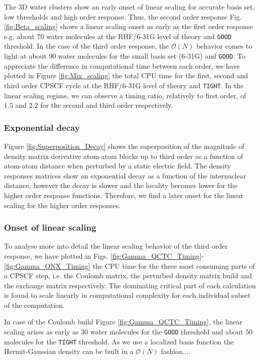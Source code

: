 \documentclass[prl,aps,twocolumn,showpacs,twocolumngrid,superbib]{revtex4}
\begin{document}
The 3D water clusters show an early onset of linear scaling for accurate
basis set, low thresholds and high order response.
Thus, the second order response Fig. \ref{fig:Beta_scaling} shows a linear scaling
onset as early as the first order response e.g. about 70 water molecules at
the RHF/6-31G level of theory and {\tt GOOD} threshold. In the case of the third order
response, the $\mathcal{O}(N)$ behavior comes to light at about 90 water 
molecules for the small basis set (6-31G) and {\tt GOOD}. 
To appreciate the difference in computational time between each order,
we have plotted in Figure \ref{fig:Mix_scaling} the total CPU time for the
first, second and third order CPSCF cycle at the RHF/6-31G level of theory and {\tt TIGHT}. 
In the linear scaling regime, we can observe a timing ratio, relatively to first order, 
of $1.5$ and $2.2$ for the second and third order respectively.

\subsubsection{Exponential decay}
Figure \ref{fig:Superposition_Decay} shows the superposition 
of the magnitude of density matrix derivative atom-atom blocks up to 
third order as a function of atom-atom distance when perturbed by 
a static electric field. 
The density responses matrices show an exponential decay as a function
of the internuclear distance, however the decay is slower and the locality
becomes lower for the higher order response functions.
Therefore, we find a later onset for the linear scaling for the higher order
responses. 


\subsubsection{Onset of linear scaling}

To analyse more into detail the linear scaling behavior of the third order
response, we have plotted in Figs. \ref{fig:Gamma_QCTC_Timing}-\ref{fig:Gamma_ONX_Timing} 
the CPU time for the three most consuming parts of a CPSCF step, i.e. the Coulomb matrix, 
the perturbed density matrix build and the exchange matrix respectively. 
The dominating critical part of each calculation is found to scale linearly
in computational complexity for each individual subset of the computation. 

In case of the Coulomb build Figure \ref{fig:Gamma_QCTC_Timing}, 
the linear scaling arises as early as 30 water molecules for the 
{\tt GOOD} threshold and about 50 molecules for the
{\tt TIGHT} threshold. As we use a localized basis function the 
Hermit-Gaussian density can be built in a $\mathcal{O}(N)$ fashion....
\end{document}
